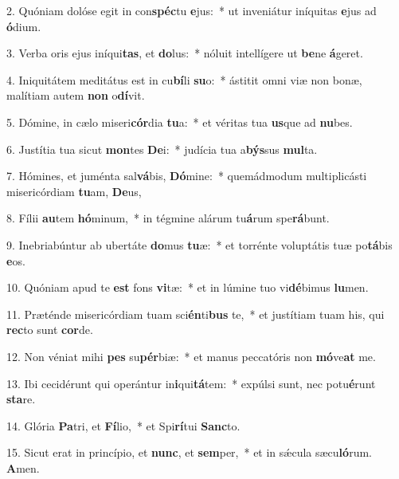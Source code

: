 2. Quóniam dolóse egit in con\textbf{spéc}tu \textbf{e}jus:~*  ut inveniátur iníquitas \textbf{e}jus ad \textbf{ó}dium.\

3. Verba oris ejus iníqui\textbf{tas}, et \textbf{do}lus:~*  nóluit intellígere ut \textbf{be}ne \textbf{á}geret.\

4. Iniquitátem meditátus est in cu\textbf{bí}li \textbf{su}o:~*  ástitit omni viæ non bonæ, malítiam autem \textbf{non} o\textbf{dí}vit.\

5. Dómine, in cælo miseri\textbf{cór}dia \textbf{tu}a:~*  et véritas tua \textbf{us}que ad \textbf{nu}bes.\

6. Justítia tua sicut \textbf{mon}tes \textbf{De}i:~*  judícia tua a\textbf{býs}sus \textbf{mul}ta.\

7. Hómines, et juménta sal\textbf{vá}bis, \textbf{Dó}mine:~*  quemádmodum multiplicásti misericórdiam \textbf{tu}am, \textbf{De}us,\

8. Fílii \textbf{au}tem \textbf{hó}minum,~*  in tégmine alárum tu\textbf{á}rum spe\textbf{rá}bunt.\

9. Inebriabúntur ab ubertáte \textbf{do}mus \textbf{tu}æ:~*  et torrénte voluptátis tuæ po\textbf{tá}bis \textbf{e}os.\

10. Quóniam apud te \textbf{est} fons \textbf{vi}tæ:~*  et in lúmine tuo vi\textbf{dé}bimus \textbf{lu}men.\

11. Præténde misericórdiam tuam sci\textbf{én}ti\textbf{bus} te,~*  et justítiam tuam his, qui \textbf{rec}to sunt \textbf{cor}de.\

12. Non véniat mihi \textbf{pes} su\textbf{pér}biæ:~*  et manus peccatóris non \textbf{mó}ve\textbf{at} me.\

13. Ibi cecidérunt qui operántur in\textbf{i}qui\textbf{tá}tem:~*  expúlsi sunt, nec potu\textbf{é}runt \textbf{sta}re.\

14. Glória \textbf{Pa}tri, et \textbf{Fí}lio,~*  et Spi\textbf{rí}tui \textbf{Sanc}to.\

15. Sicut erat in princípio, et \textbf{nunc}, et \textbf{sem}per,~*  et in sǽcula sæcu\textbf{ló}rum. \textbf{A}men.\

